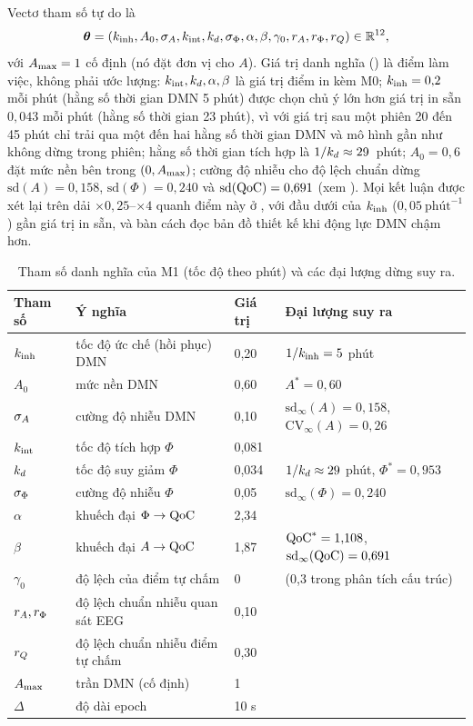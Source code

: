 Vectơ tham số tự do là
\begin{equation}
  \boldsymbol{\theta}=(k_{\mathrm{inh}},A_0,\sigma_{A},k_{\mathrm{int}},k_{d},\sigma_{\Phi},\alpha,\beta,\gamma_0,r_{A},r_{\Phi},r_{Q})\in\mathbb{R}^{12},
\end{equation}
với $A_{\max}=1$ cố định (nó đặt đơn vị cho $A$). Giá trị danh nghĩa () là điểm làm việc, không phải ước lượng: $k_{\mathrm{int}},k_{d},\alpha,\beta$ là giá trị điểm in kèm M0; $k_{\mathrm{inh}}=0{,}2$ mỗi phút (hằng số thời gian DMN 5 phút) được chọn chủ ý lớn hơn giá trị in sẵn $0{,}043$ mỗi phút (hằng số thời gian 23 phút), vì với giá trị sau một phiên 20 đến 45 phút chỉ trải qua một đến hai hằng số thời gian DMN và mô hình gần như không dừng trong phiên; hằng số thời gian tích hợp là $1/k_{d}\approx 29$~phút; $A_0=0{,}6$ đặt mức nền bên trong $(0,A_{\max})$; cường độ nhiễu cho độ lệch chuẩn dừng $\mathrm{sd}(A)=0{,}158$, $\mathrm{sd}(\Phi)=0{,}240$ và $\mathrm{sd}(\mathrm{QoC})=0{,}691$ (xem ). Mọi kết luận được xét lại trên dải $\times0{,}25$--$\times4$ quanh điểm này ở , với đầu dưới của $k_{\mathrm{inh}}$ ($0{,}05\ \text{phút}^{-1}$) gần giá trị in sẵn, và  bàn cách đọc bản đồ thiết kế khi động lực DMN chậm hơn.

\begin{table}[t]
\centering\small
\caption{Tham số danh nghĩa của M1 (tốc độ theo phút) và các đại lượng dừng suy ra.}
\label{tab:nominal}
\setlength{\tabcolsep}{4pt}
\begin{tabular}{llll}
\toprule
Tham số & Ý nghĩa & Giá trị & Đại lượng suy ra \\
\midrule
$k_{\mathrm{inh}}$ & tốc độ ức chế (hồi phục) DMN & 0,20 & $1/k_{\mathrm{inh}} = 5$ phút \\
$A_0$ & mức nền DMN & 0,60 & $A^*=0{,}60$ \\
$\sigma_{A}$ & cường độ nhiễu DMN & 0,10 & $\mathrm{sd}_\infty(A)=0{,}158$, $\mathrm{CV}_\infty(A)=0{,}26$ \\
$k_{\mathrm{int}}$ & tốc độ tích hợp $\Phi$ & 0,081 & \\
$k_{d}$ & tốc độ suy giảm $\Phi$ & 0,034 & $1/k_{d}\approx 29$ phút, $\Phi^*=0{,}953$ \\
$\sigma_{\Phi}$ & cường độ nhiễu $\Phi$ & 0,05 & $\mathrm{sd}_\infty(\Phi)=0{,}240$ \\
$\alpha$ & khuếch đại $\Phi\to\mathrm{QoC}$ & 2,34 & \\
$\beta$ & khuếch đại $A\to\mathrm{QoC}$ & 1,87 & $\mathrm{QoC}^*=1{,}108$, $\mathrm{sd}_\infty(\mathrm{QoC})=0{,}691$ \\
$\gamma_0$ & độ lệch của điểm tự chấm & 0 & (0,3 trong phân tích cấu trúc) \\
$r_{A},r_{\Phi}$ & độ lệch chuẩn nhiễu quan sát EEG & 0,10 & \\
$r_{Q}$ & độ lệch chuẩn nhiễu điểm tự chấm & 0,30 & \\
$A_{\max}$ & trần DMN (cố định) & 1 & \\
$\Delta$ & độ dài epoch & 10 s & \\
\bottomrule
\end{tabular}
\end{table}

